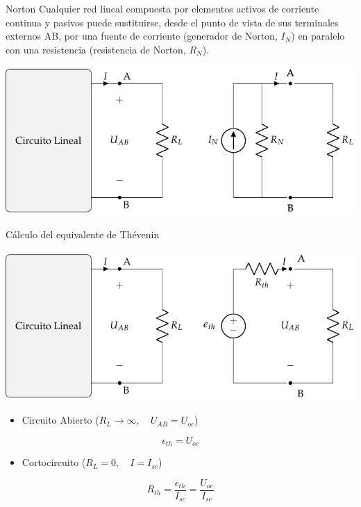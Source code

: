 \documentclass[aspectratio=169, usenames,svgnames,dvipsnames]{beamer}
\begin{document}
\begin{frame}[label={sec:org372d5b8}]{Norton}
Cualquier \alert{red lineal} compuesta por elementos activos de corriente continua y pasivos puede sustituirse, desde el punto de vista de sus terminales externos AB, por una \alert{fuente de corriente} (generador de Norton, \(I_N\)) en \alert{paralelo} con una resistencia (resistencia de Norton, \(R_N\)).
\begin{center}
\includegraphics[height=0.6\textheight]{../figs/EquivalenteNorton_R.pdf}
\end{center}
\end{frame}

\begin{frame}[label={sec:org4644e00}]{Cálculo del equivalente de Thévenin}
\begin{center}
\includegraphics[height=0.43\textheight]{../figs/EquivalenteThevenin_R.pdf}
\end{center}

\begin{itemize}
\item Circuito Abierto (\(R_L \to \infty, \quad U_{AB} = U_{oc}\))
\end{itemize}
\[
\boxed{\epsilon_{th} = U_{oc}}
\]
\begin{itemize}
\item Cortocircuito (\(R_L = 0, \quad I = I_{sc}\))
\end{itemize}
\[
\boxed{R_{th} = \frac{\epsilon_{th}}{I_{sc}} = \frac{U_{oc}}{I_{sc}}}
\]
\end{frame}
\end{document}
